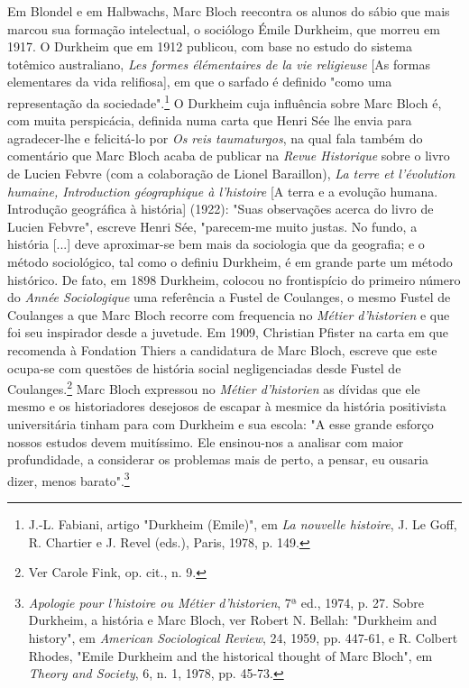 \documentclass[a5paper]{book}
\begin{document}
Em Blondel e em Halbwachs, Marc Bloch reecontra os alunos do sábio que mais marcou sua formação intelectual, o sociólogo Émile Durkheim, que morreu em 1917. O Durkheim que em 1912 publicou, com base no estudo do sistema totêmico australiano, \textit{Les formes élémentaires de la vie religieuse} [As formas elementares da vida relif{\kern0pt}iosa], em que o sarfado é def{\kern0pt}inido "como uma representação da sociedade".\footnote{J.-L. Fabiani, artigo "Durkheim (Emile)", em \textit{La nouvelle histoire}, J. Le Gof{\kern0pt}f, R. Chartier e J. Revel (eds.), Paris, 1978, p. 149.} O Durkheim cuja inf{\kern0pt}luência sobre Marc Bloch é, com muita perspicácia, def{\kern0pt}inida numa carta que Henri Sée lhe envia para agradecer-lhe e felicitá-lo por \textit{Os reis taumaturgos}, na qual fala também do comentário que Marc Bloch acaba de publicar na \textit{Revue Historique} sobre o livro de Lucien Febvre (com a colaboração de Lionel Baraillon), \textit{La terre et l'évolution humaine, Introduction géographique à l'histoire} [A terra e a evolução humana. Introdução geográf{\kern0pt}ica à história] (1922): "Suas observações acerca do livro de Lucien Febvre", escreve Henri Sée, "parecem-me muito justas. No fundo, a história [...]
deve aproximar-se bem mais da sociologia que da geograf{\kern0pt}ia; e o método sociológico, tal como o def{\kern0pt}iniu Durkheim, é em grande parte um método histórico. De fato, em 1898 Durkheim, colocou no frontispício do primeiro número do \textit{Année Sociologique} uma referência a Fustel de Coulanges, o mesmo Fustel de Coulanges a que Marc Bloch recorre com frequencia no \textit{Métier d'historien} e que foi seu inspirador desde a juvetude. Em 1909, Christian Pf{\kern0pt}ister na carta em que recomenda à Fondation Thiers a candidatura de Marc Bloch, escreve que este ocupa-se com questões de história social negligenciadas desde Fustel de Coulanges.\footnote{Ver Carole Fink, op. cit., n. 9.} Marc Bloch expressou no \textit{Métier d'historien} as dívidas que ele mesmo e os historiadores desejosos de escapar à mesmice da história positivista universitária tinham para com Durkheim e sua escola: "A esse grande esforço nossos estudos devem muitíssimo. Ele ensinou-nos a analisar com maior profundidade, a considerar os problemas mais de perto, a pensar, eu ousaria dizer, menos barato".\footnote{\textit{Apologie pour l'histoire ou Métier d'historien}, 7ª ed., 1974, p. 27. Sobre Durkheim, a história e Marc Bloch, ver Robert N. Bellah: "Durkheim and history", em \textit{American Sociological Review}, 24, 1959, pp. 447-61, e R. Colbert Rhodes, "Emile Durkheim and the historical thought of Marc Bloch", em \textit{Theory and Society}, 6, n. 1, 1978, pp. 45-73.}
\end{document}
